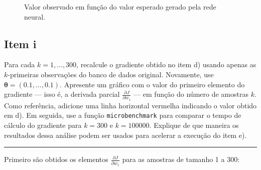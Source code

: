 \documentclass[
  a4paperpaper,
]{article}
\begin{document}
\begin{figure}[H]


\caption{\label{fig-esperadoobservado}Valor observado em função do valor
esperado gerado pela rede neural.}

\end{figure}%

\subsection{Item i}\label{item-i}

Para cada \(k = 1,\dots, 300\), recalcule o gradiente obtido no item d)
usando apenas as \(k\)-primeiras observações do banco de dados original.
Novamente, use \(\boldsymbol{\theta} = (0.1, \dots, 0.1)\). Apresente um
gráfico com o valor do primeiro elemento do gradiente --- isso é, a
derivada parcial \(\frac{\partial J}{\partial w_1}\) --- em função do
número de amostras \(k\). Como referência, adicione uma linha horizontal
vermelha indicando o valor obtido em d). Em seguida, use a função
\texttt{microbenchmark} para comparar o tempo de cálculo do gradiente
para \(k = 300\) e \(k = 100000\). Explique de que maneira os resultados
dessa análise podem ser usados para acelerar a execução do item e).

\begin{center}\rule{0.5\linewidth}{0.5pt}\end{center}

Primeiro são obtidos os elementos \(\frac{\partial J}{\partial w_1}\)
para as amostras de tamanho 1 a 300:
\end{document}
